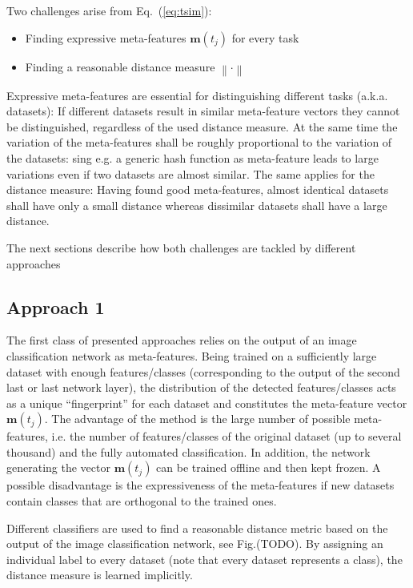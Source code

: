 \documentclass{article}
\begin{document}
Two challenges arise from Eq.~(\ref{eq:tsim}):
%
\begin{itemize}
\item Finding expressive meta-features $\mathbf{m}(t_j)$ for every task
\item Finding a reasonable distance measure $\left\| \cdot \right\|$ 
\end{itemize} 
%
Expressive meta-features are essential for distinguishing different tasks (a.k.a. datasets): If different datasets result in similar meta-feature vectors they cannot be distinguished, regardless of the used distance measure. At the same time the variation of the meta-features shall be roughly proportional to the variation of the datasets: sing e.g. a generic hash function as meta-feature leads to large variations even if two datasets are almost similar. The same applies for the distance measure: Having found good meta-features, almost identical datasets shall have only a small distance whereas dissimilar datasets shall have a large distance. 

The next sections describe how both challenges are tackled by different approaches

\subsection{Approach 1}
\label{sec:expressiveMeta}

The first class of presented approaches relies on the output of an image classification network as meta-features. Being trained on a sufficiently large dataset with enough features/classes (corresponding to the output of the second last or last network layer), the distribution of the detected features/classes acts as a unique ``fingerprint'' for each dataset and constitutes the meta-feature vector $\mathbf{m}(t_j)$. 
The advantage of the method is the large number of possible meta-features, i.e. the number of features/classes of the original dataset (up to several thousand) and the fully automated classification. In addition, the network generating the vector $\mathbf{m}(t_j)$ can be trained offline and then kept frozen. A possible disadvantage is the expressiveness of the meta-features if new datasets contain classes that are orthogonal to the trained ones.

Different classifiers are used to find a reasonable distance metric based on the output of the image classification network, see Fig.(TODO). By assigning an individual label to every dataset (note that every dataset represents a class), the distance measure is learned implicitly.
\end{document}
